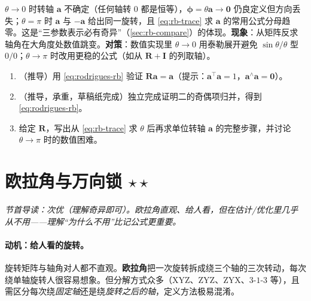 \begin{pitfall}[思维陷阱：轴角在 $\theta=0,\pi$ 附近的退化]
$\theta\to0$ 时转轴 $\mathbf{a}$ 不确定（任何轴转 $0$ 都是恒等），$\boldsymbol{\phi}=\theta\mathbf{a}\to\mathbf{0}$ 仍良定义但方向丢失；$\theta=\pi$ 时 $\mathbf{a}$ 与 $-\mathbf{a}$ 给出同一旋转，且 \cref{eq:rb-trace} 求 $\mathbf{a}$ 的常用公式分母趋零。这是“三参数表示必有奇异”（\cref{sec:rb-compare}）的体现。\textbf{现象}：从矩阵反求轴角在大角度处数值跳变。\textbf{对策}：数值实现里 $\theta\to0$ 用泰勒展开避免 $\sin\theta/\theta$ 型 $0/0$；$\theta\to\pi$ 时改用更稳的公式（如从 $\mathbf{R}+\mathbf{I}$ 的列取轴）。
\end{pitfall}

\begin{practice}
\begin{enumerate}
  \item （推导）用 \cref{eq:rodrigues-rb} 验证 $\mathbf{R}\mathbf{a}=\mathbf{a}$（提示：$\mathbf{a}^\top\mathbf{a}=1$，$\mathbf{a}^\wedge\mathbf{a}=\mathbf{0}$）。
  \item （推导，承重，草稿纸完成）独立完成证明二的奇偶项归并，得到 \cref{eq:rodrigues-rb}。
  \item 给定 $\mathbf{R}$，写出从 \cref{eq:rb-trace} 求 $\theta$ 后再求单位转轴 $\mathbf{a}$ 的完整步骤，并讨论 $\theta\to\pi$ 时的数值困难。
\end{enumerate}
\end{practice}

\section{欧拉角与万向锁 \texorpdfstring{$\star\star$}{**}}
\label{sec:rb-euler}
\noindent\emph{节首导读：次优（理解奇异即可）。欧拉角直观、给人看，但在估计/优化里几乎从不用——理解“为什么不用”比记公式更重要。}

\paragraph{动机：给人看的旋转。}旋转矩阵与轴角对人都不直观。\textbf{欧拉角}把一次旋转拆成绕三个轴的三次转动，每次绕单轴旋转人很容易想象\cite{gaoxiang2019slam14}。但分解方式众多（XYZ、ZYZ、ZYX、$3$-$1$-$3$ 等），且需区分每次绕\emph{固定轴}还是绕\emph{旋转之后的轴}，定义方法极易混淆。

